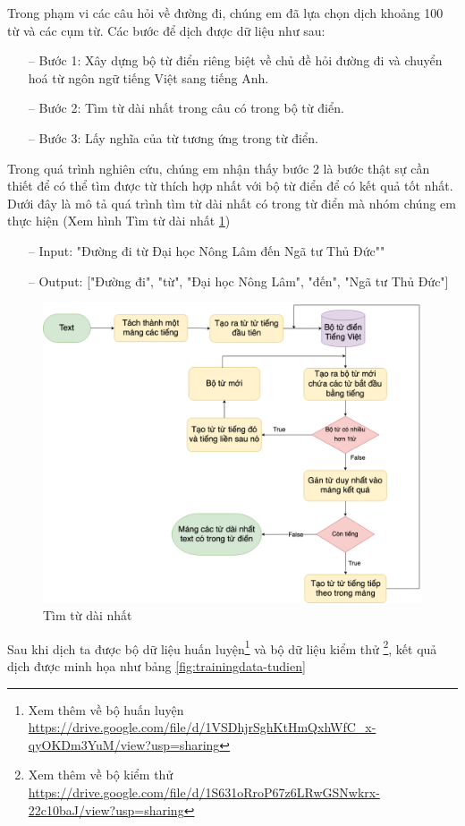 Trong phạm vi các câu hỏi về đường đi, chúng em đã lựa chọn dịch khoảng 100 từ và các cụm từ. Các bước để dịch được dữ liệu như sau:
\begin{itemize}
    \item[--] Bước 1: Xây dựng bộ từ điển riêng biệt về chủ đề hỏi đường đi và chuyển hoá từ ngôn ngữ tiếng Việt sang tiếng Anh.
    \item[--] Bước 2: Tìm từ dài nhất trong câu có trong bộ từ điển.
    \item[--] Bước 3: Lấy nghĩa của từ tương ứng trong từ điển.
\end{itemize}
Trong quá trình nghiên cứu, chúng em nhận thấy bước 2 là bước thật sự cần thiết để có thể tìm được từ thích hợp nhất với bộ từ điển để có kết quả tốt nhất. Dưới đây là mô tả quá trình tìm từ dài nhất có trong từ điển mà nhóm chúng em thực hiện (Xem hình Tìm từ dài nhất \ref{fig:longest-word})
\begin{itemize}
    \item[--] Input: "Đường đi từ Đại học Nông Lâm đến Ngã tư Thủ Đức""
    \item[--] Output: ["Đường đi", "từ", "Đại học Nông Lâm", "đến", "Ngã tư Thủ Đức"]
\end{itemize}
\begin{figure}[H]
    \centering
    \includegraphics[width=15cm]{images/Diagram-longest-word.png}
    \caption{Tìm từ dài nhất}
    \label{fig:longest-word}
\end{figure}

Sau khi dịch ta được bộ dữ liệu huấn luyện\footnote{Xem thêm về bộ huấn luyện \url{https://drive.google.com/file/d/1VSDhjrSghKtHmQxhWfC_x-qyOKDm3YuM/view?usp=sharing}} và bộ dữ liệu kiểm thử \footnote{Xem thêm về bộ kiểm thử \url{https://drive.google.com/file/d/1S631oRroP67z6LRwGSNwkrx-22c10baJ/view?usp=sharing}}, kết quả dịch được minh họa như bảng \ref{fig:trainingdata-tudien}

